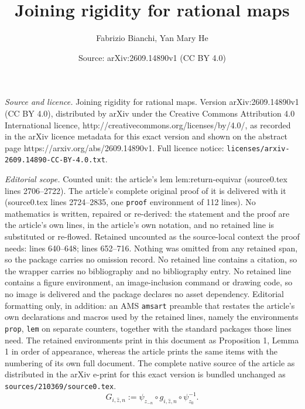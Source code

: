 \documentclass[10pt,a4paper]{amsart}
\title{Joining rigidity for rational maps}
\author{Fabrizio Bianchi, Yan Mary He}
\date{Source: arXiv:2609.14890v1 (CC BY 4.0)}
\begin{document}
\maketitle

\noindent\emph{Source and licence.} Joining rigidity for rational maps. Version arXiv:2609.14890v1 (CC BY 4.0), distributed by arXiv under the Creative Commons Attribution 4.0 International licence, http://creativecommons.org/licenses/by/4.0/, as recorded in the arXiv licence metadata for this exact version and shown on the abstract page https://arxiv.org/abs/2609.14890v1. Full licence notice: \texttt{licenses/arxiv-2609.14890-CC-BY-4.0.txt}.\par\smallskip

\noindent\textit{Editorial scope.} Counted unit: the article's lem lem:return-equivar (source0.tex lines 2706--2722). The article's complete original proof of it is delivered with it (source0.tex lines 2724--2835, one \texttt{proof} environment of 112 lines). No mathematics is written, repaired or re-derived: the statement and the proof are the article's own lines, in the article's own notation, and no retained line is substituted or re-flowed.  Retained uncounted as the source-local context the proof needs: lines 640--648; lines 652--716.  Nothing was omitted from any retained span, so the package carries no omission record.  No retained line contains a citation, so the wrapper carries no bibliography and no bibliography entry.  No retained line contains a figure environment, an image-inclusion command or drawing code, so no image is delivered and the package declares no asset dependency.  Editorial formatting only, in addition: an AMS \texttt{amsart} preamble that restates the article's own declarations and macros used by the retained lines, namely the environments \texttt{prop}, \texttt{lem} on separate counters, together with the standard packages those lines need.  The retained environments print in this document as Proposition 1, Lemma 1 in order of appearance, whereas the article prints the same items with the numbering of its own full document.  The complete native source of the article as distributed in the arXiv e-print for this exact version is bundled unchanged as \texttt{sources/210369/source0.tex}.
\begin{equation}\label{eq:G}
G_{i,\hat z,n}
:=
\psi_{z_{-n}}
\circ
g_{i,\hat z,n}
\circ
\psi_{z_0}^{-1}.
\end{equation}
\end{document}
